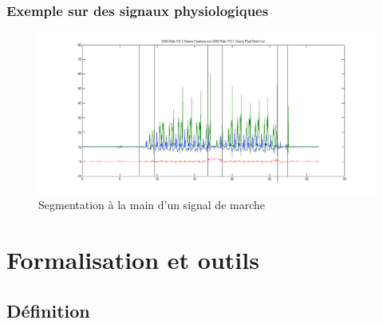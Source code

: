 \documentclass{beamer}
\begin{document}
\begin{frame}
	\frametitle{Exemple sur des signaux physiologiques}
	\begin{figure}
		\includegraphics[scale=0.3]{exemple_seg.png}
		\caption{Segmentation à la main d'un signal de marche}
	\end{figure}
\end{frame}


		
	

\section{Formalisation et outils}

\subsection{Définition}
\end{document}

